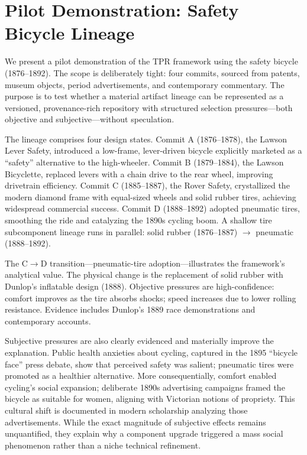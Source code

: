 \section{Pilot Demonstration: Safety Bicycle Lineage}

We present a pilot demonstration of the TPR framework using the safety bicycle (1876--1892). The scope is deliberately tight: four commits, sourced from patents, museum objects, period advertisements, and contemporary commentary. The purpose is to test whether a material artifact lineage can be represented as a versioned, provenance-rich repository with structured selection pressures---both objective and subjective---without speculation.

The lineage comprises four design states. Commit A (1876--1878), the Lawson Lever Safety, introduced a low-frame, lever-driven bicycle explicitly marketed as a ``safety'' alternative to the high-wheeler. Commit B (1879--1884), the Lawson Bicyclette, replaced levers with a chain drive to the rear wheel, improving drivetrain efficiency. Commit C (1885--1887), the Rover Safety, crystallized the modern diamond frame with equal-sized wheels and solid rubber tires, achieving widespread commercial success. Commit D (1888--1892) adopted pneumatic tires, smoothing the ride and catalyzing the 1890s cycling boom. A shallow tire subcomponent lineage runs in parallel: solid rubber (1876--1887) $\rightarrow$ pneumatic (1888--1892).

The C$\rightarrow$D transition---pneumatic-tire adoption---illustrates the framework's analytical value. The physical change is the replacement of solid rubber with Dunlop's inflatable design (1888). Objective pressures are high-confidence: comfort improves as the tire absorbs shocks; speed increases due to lower rolling resistance. Evidence includes Dunlop's 1889 race demonstrations and contemporary accounts.

Subjective pressures are also clearly evidenced and materially improve the explanation. Public health anxieties about cycling, captured in the 1895 ``bicycle face'' press debate, show that perceived safety was salient; pneumatic tires were promoted as a healthier alternative. More consequentially, comfort enabled cycling's social expansion; deliberate 1890s advertising campaigns framed the bicycle as suitable for women, aligning with Victorian notions of propriety. This cultural shift is documented in modern scholarship analyzing those advertisements. While the exact magnitude of subjective effects remains unquantified, they explain why a component upgrade triggered a mass social phenomenon rather than a niche technical refinement.

